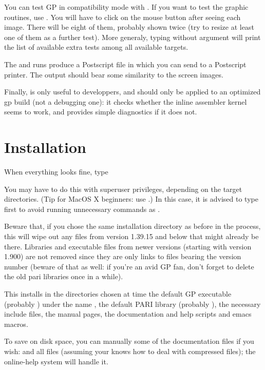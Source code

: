 You can test GP in compatibility mode with . If you
want to test the graphic routines, use . You will
have to click on the mouse button after seeing each image. There will be
eight of them, probably shown twice (try to resize at least one of them
as a further test). More generaly, typing  without argument
will print the list of available extra tests among all available targets.

The  and  runs produce a Postscript
file  in  which you can send to a Postscript
printer. The output should bear some similarity to the screen images.

Finally,  is only useful to developpers, and should
only be applied to an optimized gp build (not a debugging one): it checks
whether the inline assembler kernel seems to work, and provides simple
diagnostics if it does not.

\section{Installation} When everything looks fine, type


\noindent You may have to do this with superuser privileges, depending on
the target directories. (Tip for MacOS X beginners: use
.) In this case, it is advised to type 
first to avoid running unnecessary commands as .

Beware that, if you chose the same installation directory as before in the
 process, this will wipe out any files from version 1.39.15
and below that might already be there. Libraries and executable files from
newer versions (starting with version 1.900) are not removed since they are
only links to files bearing the version number (beware of that as well: if
you're an avid GP fan, don't forget to delete the old pari libraries once in
a while).

This installs in the directories chosen at  time the default
GP executable (probably ) under the name , the default
PARI library (probably ), the necessary include files, the
manual pages, the documentation and help scripts and emacs macros.

To save on disk space, you can manually  some of the documentation
files if you wish:  and all  files (assuming your
 knows how to deal with compressed files); the online-help system
will handle it.

